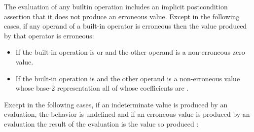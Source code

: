 \begin{adjustwidth}{0.5cm}{0.5cm}
\begin{addedblock}
The evaluation of any builtin operation includes an implicit postcondition assertion 
that it does not produce an erroneous value.  Except in the following cases,
if any operand of a built-in operator is erroneous then the value
produced by that operator is erroneous:
\begin{itemize}
\item  If the built-in operation is \tcode{*} or \tcode{\&} and the other operand is a non-erroneous zero value.
\item  If the built-in operation is \tcode{|} and the other operand is a non-erroneous value whose base-2 representation all of whose coefficients are .
\end{itemize}
\end{addedblock}

Except in the following cases,
if an indeterminate value is produced by an evaluation,
the behavior is undefined
 and if an erroneous value is produced by an evaluation
the result of the evaluation is the value so produced 
:


\end{adjustwidth}
